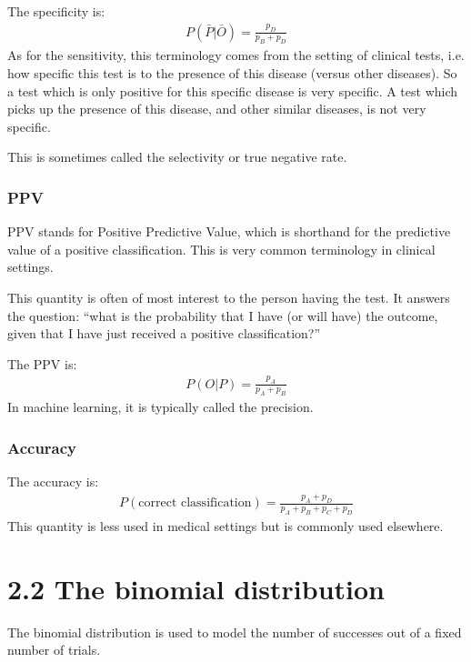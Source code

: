 \documentclass[letterpaper,10pt,english]{jupyterBook}
\begin{document}
\sphinxAtStartPar
The specificity is:
\begin{equation*}
\begin{split}
P(\bar{P}|\bar{O})=\frac{p_D}{p_B+p_D}
\end{split}
\end{equation*}
\sphinxAtStartPar
As for the sensitivity, this terminology comes from the setting of clinical tests, i.e. how specific  this test is to the presence of this disease (versus other diseases). So a test which is only positive for this specific disease is very specific. A test which picks up the presence of this disease, and other similar diseases, is not very specific.

\sphinxAtStartPar
This is sometimes called the selectivity or true negative rate.
\subsubsection*{PPV}

\sphinxAtStartPar
PPV stands for Positive Predictive Value, which is shorthand for the predictive value of a positive classification. This is very common terminology in clinical settings.

\sphinxAtStartPar
This quantity is often of most interest to the person having the test. It answers the question: “what is the probability that I have (or will have) the outcome, given that I have just received a positive classification?”

\sphinxAtStartPar
The PPV is:
\begin{equation*}
\begin{split}
P(O|P) = \frac{p_A}{p_A+p_B}
\end{split}
\end{equation*}
\sphinxAtStartPar
In machine learning, it is typically called the precision.
\subsubsection*{Accuracy}

\sphinxAtStartPar
The accuracy is:
\begin{equation*}
\begin{split}
P(\mbox{correct classification}) = \frac{p_A + p_D}{p_A+p_B+p_C+p_D}
\end{split}
\end{equation*}
\sphinxAtStartPar
This quantity is less used in medical settings but is commonly used elsewhere.


\section{2.2 The binomial distribution}
\label{\detokenize{02.c. Probability.Discrete:the-binomial-distribution}}\label{\detokenize{02.c. Probability.Discrete::doc}}
\sphinxAtStartPar
The binomial distribution is used to model the number of successes out of a fixed number of trials.
\end{document}

